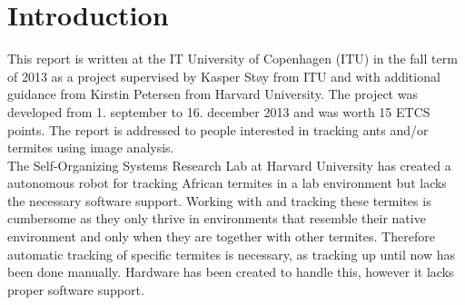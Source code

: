
\section{Introduction}

% 
% 

This report is written at the IT University of Copenhagen (ITU) in the fall term of 2013 as a project supervised by Kasper Støy from ITU and with additional guidance from Kirstin Petersen from Harvard University. The project was developed from 1. september to 16. december 2013 and was worth 15 ETCS points. The report is addressed to people interested in tracking ants and/or termites using image analysis. \\

The Self-Organizing Systems Research Lab at Harvard University has created a autonomous robot for tracking African termites in a lab environment but lacks the necessary software support. Working with and tracking these termites is cumbersome as they only thrive in environments that resemble their native environment and only when they are together with other termites. Therefore automatic tracking of specific termites is necessary, as tracking up until now has been done manually. Hardware has been created to handle this, however it lacks proper software support. \\

